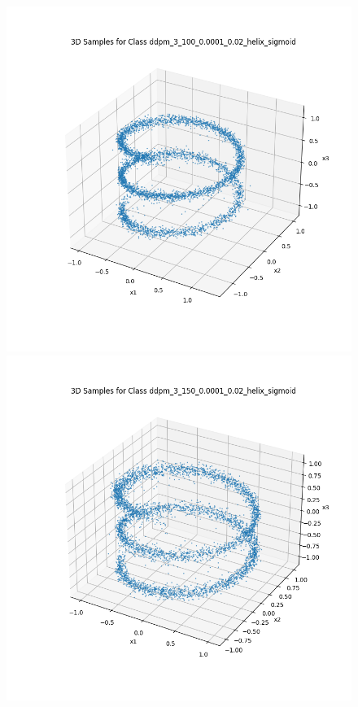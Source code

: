 \documentclass[a4paper,12pt]{article}
\begin{document}
\begin{figure}[H]
  \begin{minipage}{0.3\textwidth}
      \centering
      \includegraphics[width=\linewidth]{"images/Samples for ddpm_3_100_0.0001_0.02_helix_sigmoid.png"}
  \end{minipage}
  \begin{minipage}{0.3\textwidth}
      \centering
      \includegraphics[width=\linewidth]{"images/Samples for ddpm_3_150_0.0001_0.02_helix_sigmoid.png"}

\end{minipage}
\end{figure}
\end{document}
